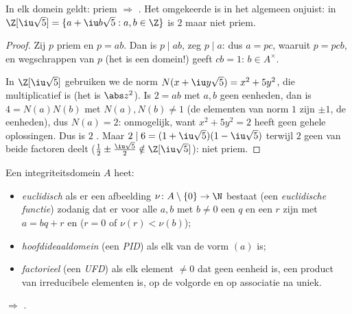\begin{proposition}\label{prop:b3:rings:primeirred}
In elk domein geldt: priem $\Rightarrow$ . Het
omgekeerde is in het algemeen onjuist: in $\Z[\iu\sqrt 5] = \{a +
\iu b\sqrt5 : a, b \in \Z\}$ is $2$  maar niet priem.
\end{proposition}

\begin{proof}
Zij $p$ priem en $p = ab$. Dan is $p \mid ab$, zeg $p \mid a$: dus
$a = pc$, waaruit $p = pcb$, en wegschrappen van $p$ (het is een
domein!) geeft $cb = 1$: $b \in A^\times$.

In $\Z[\iu\sqrt5]$ gebruiken we de norm $N(x + \iu y\sqrt 5) = x^2
+ 5y^2$, die multiplicatief is (het is $\abs z^2$). Is $2 = ab$ met
$a, b$ geen eenheden, dan is $4 = N(a)N(b)$ met $N(a), N(b) \neq 1$
(de elementen van norm $1$ zijn $\pm1$, de eenheden), dus $N(a) =
2$: onmogelijk, want $x^2 + 5y^2 = 2$ heeft geen gehele
oplossingen. Dus is $2$ . Maar $2 \mid 6 = (1 +
\iu\sqrt5)(1 - \iu\sqrt5)$ terwijl $2$ geen van beide factoren
deelt ($\frac12 \pm \frac{\iu\sqrt5}2 \notin \Z[\iu\sqrt5]$): niet
priem.
\end{proof}

\begin{definition}\label{def:b3:rings:pidufd}
Een integriteitsdomein $A$ heet:
\begin{itemize}
  \item \emph{euclidisch} als er een
        afbeelding $\nu \colon A \setminus \{0\} \to \N$ bestaat
        (een \emph{euclidische functie}) zodanig dat er voor alle
        $a, b$ met $b \ne 0$ een $q$ en een $r$ zijn met $a = bq +
        r$ en ($r = 0$ of $\nu(r) < \nu(b)$);
  \item \emph{hoofdideaaldomein} (een
        \emph{PID}) als elk  van de
        vorm $(a)$ is;
  \item \emph{factorieel} (een \emph{UFD}) als elk element $\neq 0$ dat geen
        eenheid is, een product van irreducibele elementen is, op
        de volgorde en op associatie na uniek.
\end{itemize}
\end{definition}

\begin{theorem}\label{thm:b3:rings:euclideanpid}
 $\Rightarrow$ .
\end{theorem}

